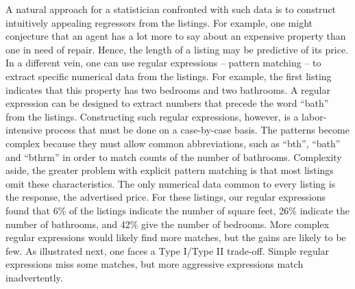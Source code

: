 \documentclass[12pt]{article}
\begin{document}
  
 A natural approach for a statistician confronted with such data is to construct
 intuitively appealing regressors from the listings.  For example, one might
 conjecture that an agent has a lot more to say about an expensive property than
 one in need of repair.  Hence, the length of a listing may be predictive of its
 price.  In a different vein, one can use regular expressions -- pattern
 matching -- to extract specific numerical data from the listings.  For example,
 the first listing indicates that this property has two bedrooms and two
 bathrooms.  A regular expression can be designed to extract numbers that
 precede the word ``bath'' from the listings.  Constructing such regular
 expressions, however, is a labor-intensive process that must be done on a
 case-by-case basis.  The patterns become complex because they must allow common
 abbreviations, such as ``bth'', ``bath'' and ``bthrm'' in order to match counts
 of the number of bathrooms.  Complexity aside, the greater problem with
 explicit pattern matching is that most listings omit these characteristics.
  The only numerical data common to every listing is the response, the
 advertised price.  For these listings, our regular expressions found that 6\%
 of the listings indicate the number of square feet, 26\% indicate the number of
 bathrooms, and 42\% give the number of bedrooms.  More complex regular
 expressions would likely find more matches, but the gains are likely to be few.
  As illustrated next, one faces a Type I/Type II trade-off.  Simple regular
 expressions miss some matches, but more aggressive expressions match
 inadvertently.
\end{document}
